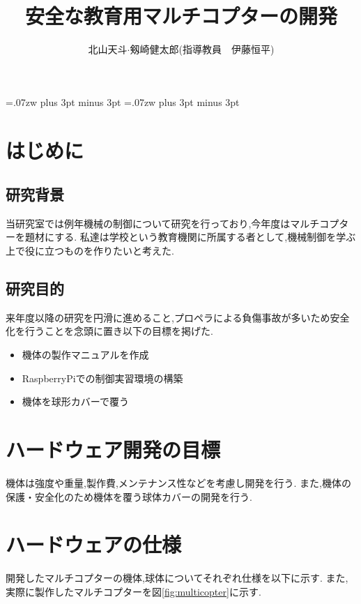 \documentclass[twocolumn,11pt]{sotsuken_abst}
\title{安全な教育用マルチコプターの開発}
\author{北山天斗$\cdot$剱崎健太郎(指導教員　伊藤恒平)}
\begin{document}
\maketitle
\thispagestyle{fancy}
\pagestyle{fancy}

\setlength{\baselineskip}{5.6truemm}
\kanjiskip=.07zw plus 3pt minus 3pt
\xkanjiskip=.07zw plus 3pt minus 3pt


\section{はじめに}

\subsection{研究背景}
当研究室では例年機械の制御について研究を行っており,今年度はマルチコプターを題材にする.
私達は学校という教育機関に所属する者として,機械制御を学ぶ上で役に立つものを作りたいと考えた.

\subsection{研究目的}
来年度以降の研究を円滑に進めること,プロペラによる負傷事故が多いため安全化を行うことを念頭に置き以下の目標を掲げた.

\begin{itemize}
	\item 機体の製作マニュアルを作成
	\item RaspberryPiでの制御実習環境の構築
	\item 機体を球形カバーで覆う
\end{itemize}


\section{ハードウェア開発の目標}
機体は強度や重量,製作費,メンテナンス性などを考慮し開発を行う.
また,機体の保護・安全化のため機体を覆う球体カバーの開発を行う.


\section{ハードウェアの仕様}
開発したマルチコプターの機体,球体についてそれぞれ仕様を以下に示す.
また,実際に製作したマルチコプターを図\ref{fig:multicopter}に示す.
\end{document}

